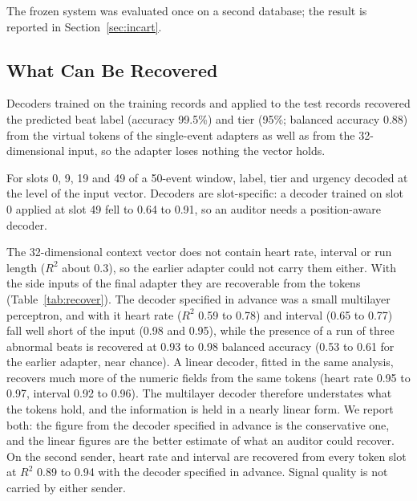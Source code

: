 \begin{table}[t]
\caption{Second sender (ResNet1D-RR): balanced accuracy on its own DS2 windows and adapter minus calibrated text (non-inferiority margin $-0.05$).}
\label{tab:second}
\centering
\footnotesize

\end{table}

 The frozen system was evaluated once on a second database; the result is reported in Section~\ref{sec:incart}.

\subsection{What Can Be Recovered}
 Decoders trained on the training records and applied to the test records recovered the predicted beat label (accuracy 99.5\%) and tier (95\%; balanced accuracy 0.88) from the virtual tokens of the single-event adapters as well as from the 32-dimensional input, so the adapter loses nothing the vector holds.

 For slots 0, 9, 19 and 49 of a 50-event window, label, tier and urgency decoded at the level of the input vector. Decoders are slot-specific: a decoder trained on slot 0 applied at slot 49 fell to 0.64 to 0.91, so an auditor needs a position-aware decoder.

 The 32-dimensional context vector does not contain heart rate, interval or run length ($R^2$ about 0.3), so the earlier adapter could not carry them either. With the side inputs of the final adapter they are recoverable from the tokens (Table~\ref{tab:recover}). The decoder specified in advance was a small multilayer perceptron, and with it heart rate ($R^2$ 0.59 to 0.78) and interval (0.65 to 0.77) fall well short of the input (0.98 and 0.95), while the presence of a run of three abnormal beats is recovered at 0.93 to 0.98 balanced accuracy (0.53 to 0.61 for the earlier adapter, near chance). A linear decoder, fitted in the same analysis, recovers much more of the numeric fields from the same tokens (heart rate 0.95 to 0.97, interval 0.92 to 0.96). The multilayer decoder therefore understates what the tokens hold, and the information is held in a nearly linear form. We report both: the figure from the decoder specified in advance is the conservative one, and the linear figures are the better estimate of what an auditor could recover. On the second sender, heart rate and interval are recovered from every token slot at $R^2$ 0.89 to 0.94 with the decoder specified in advance. Signal quality is not carried by either sender.

